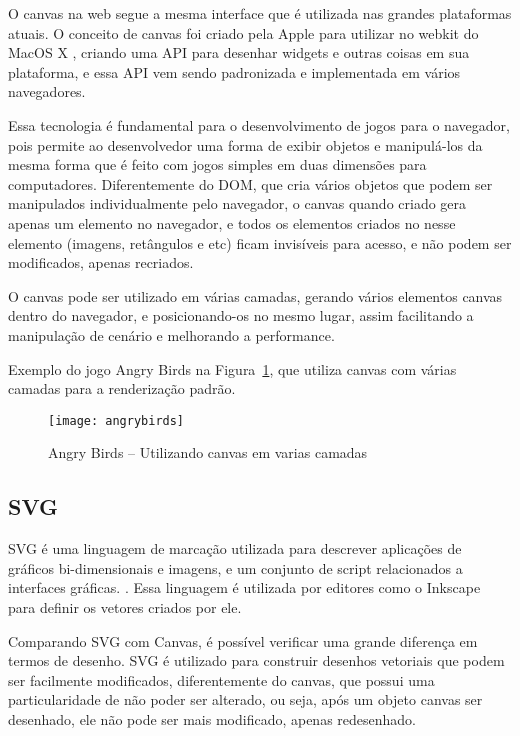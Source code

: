 O canvas na web segue a mesma interface que é utilizada nas grandes
plataformas atuais. O conceito de canvas foi criado pela Apple para
utilizar no webkit do MacOS X \cite{lubbers2010pro}, criando uma API
para desenhar widgets e outras coisas em sua plataforma, e essa API
vem sendo padronizada e implementada em vários navegadores.

Essa tecnologia é fundamental para o desenvolvimento de jogos para
o navegador, pois permite ao desenvolvedor uma forma de exibir
objetos e manipulá-los da mesma forma que é feito com jogos
simples em duas dimensões para computadores.
Diferentemente do DOM, que cria vários objetos que podem ser
manipulados individualmente pelo navegador, o canvas quando criado
gera apenas um elemento no navegador, e todos os elementos criados
no nesse elemento (imagens, retângulos e etc) ficam invisíveis para acesso, e
não podem ser modificados, apenas recriados.

O canvas pode ser utilizado em várias camadas, gerando vários
elementos canvas dentro do navegador, e posicionando-os no mesmo
lugar, assim facilitando a manipulação de cenário e melhorando a
performance.

Exemplo do jogo Angry Birds na Figura~\ref{img:angrybirds}, que
utiliza canvas com várias camadas para a renderização padrão.

\newlength{\imgwidth}
\setlength{\imgwidth}{16.09cm}
\newlength{\imgheight}
\setlength{\imgheight}{10.59cm}

\begin{figure}[H]
  \centering
	\texttt{[image: angrybirds]}
  \caption{Angry Birds {--} Utilizando canvas em varias camadas}
  \label{img:angrybirds}
\end{figure}

\clearpage


\subsection{SVG}

SVG é uma linguagem de marcação utilizada para descrever aplicações de gráficos
bi-dimensionais e imagens, e um conjunto de script relacionados a
interfaces gráficas. \cite{w3csvg}. Essa linguagem é utilizada por
editores como o Inkscape para definir os vetores criados por ele.

Comparando SVG com Canvas, é possível verificar uma grande diferença
em termos de desenho. SVG é utilizado para construir desenhos
vetoriais que podem ser facilmente modificados, diferentemente do
canvas, que possui uma particularidade de não poder ser alterado, ou
seja, após um objeto canvas ser desenhado, ele não pode ser mais
modificado, apenas redesenhado.

